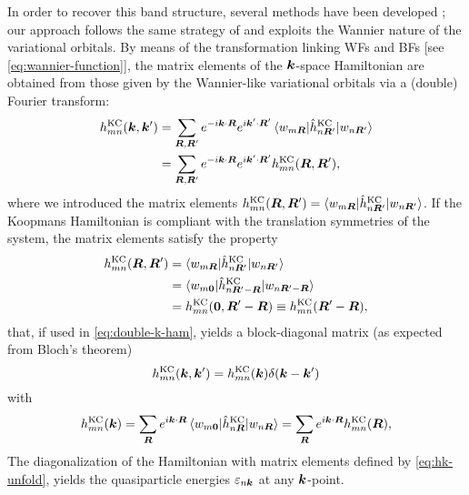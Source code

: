 In order to recover this band structure, several methods have been developed \cite{boykin_practical_2005, lee_band_2005, ku_unfolding_2010, popescu_extracting_2012, huang_general_2014, medeiros_effects_2014, zheng_quantum_2015}; our approach follows the same strategy of \cite{lee_band_2005} and exploits the Wannier nature of the variational orbitals. By means of the transformation linking WFs and BFs [see \cref{eq:wannier-function}], the matrix elements of the ${\bm k}$-space Hamiltonian are obtained from those given by the Wannier-like variational orbitals via a (double) Fourier transform:
%
\begin{equation}
    \begin{split}
        h^{\rm KC}_{mn}({\bm k},{\bm k}') &= \sum_{{\bm R},{\bm R}'} e^{-i{\bm k} \cdot {\bm R}} e^{i{\bm k}' \cdot {\bm R}'} \braket{w_{m{\bm R}} | \hat{h}^{\rm KC}_{n{\bm R}'} | w_{n{\bm R}'}} \\
        &= \sum_{{\bm R},{\bm R}'} e^{-i{\bm k} \cdot {\bm R}} e^{i{\bm k}' \cdot {\bm R}'} h^{\rm KC}_{mn}({\bm R},{\bm R}') ,
    \end{split}
    \label{eq:double-k-ham}
\end{equation}
%
where we introduced the matrix elements $h^{\rm KC}_{mn}({\bm R},{\bm R}') = \braket{w_{m{\bm R}} | \hat{h}^{\rm KC}_{n{\bm R}'} | w_{n{\bm R}'}}$. If the Koopmans Hamiltonian is compliant with the translation symmetries of the system, the matrix elements satisfy the property
%
\begin{equation}
    \begin{split}
        h^{\rm KC}_{mn}({\bm R},{\bm R}') &= \braket{w_{m{\bm R}} | \hat{h}^{\rm KC}_{n{\bm R}'} | w_{n{\bm R}'}} \\
        &= \braket{w_{m{\bm 0}} | \hat{h}^{\rm KC}_{n{\bm R}'-{\bm R}} | w_{n{\bm R}'-{\bm R}}} \\
        &= h^{\rm KC}_{mn}({\bm 0},{\bm R}'-{\bm R}) \equiv h^{\rm KC}_{mn}({\bm R}'-{\bm R}) ,
    \end{split}
    \label{eq:trans-prop-koopmans-matrix-elements}
\end{equation}
%
that, if used in \cref{eq:double-k-ham}, yields a block-diagonal matrix (as expected from Bloch's theorem)
%
\begin{equation}
    h^{\rm KC}_{mn}({\bm k},{\bm k}') = h^{\rm KC}_{mn}({\bm k}) \delta({\bm k} - {\bm k}')
    \label{eq:block-diagonal-koopmans-ham}
\end{equation}
%
with
%
\begin{equation}
    h^{\rm KC}_{mn}({\bm k}) = \sum_{{\bm R}} e^{i {\bm k} \cdot {\bm R}} \braket{w_{m\bm{0}} | \hat{h}^{\rm KC}_{n{\bm R}} | w_{n{\bm R}}} = \sum_{{\bm R}} e^{i {\bm k} \cdot {\bm R}} h^{\rm KC}_{mn}({\bm R}) ,
    \label{eq:hk-unfold}
\end{equation}
%
The diagonalization of the Hamiltonian with matrix elements defined by \cref{eq:hk-unfold}, yields the quasiparticle energies $\varepsilon_{n{\bm k}}$ at any ${\bm k}$-point.


